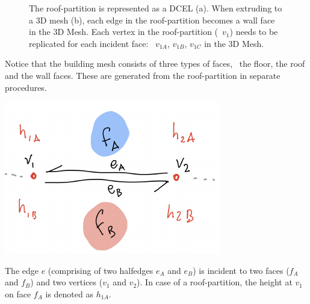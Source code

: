\begin{figure}
\begin{subfigure}[b]{0.45\linewidth}
		\caption{}%
		\label{subfig:3ddcel}
	\end{subfigure}
	\caption{The roof-partition is represented as a DCEL (a). When extruding to a 3D mesh (b), each edge in the roof-partition becomes a wall face in the 3D Mesh. Each vertex in the roof-partition (\eg\ $v_1$) needs to be replicated for each incident face: \eg\ $v_{1A}$, $v_{1B}$, $v_{1C}$ in the 3D Mesh.}%
	\label{fig:extrusion}
\end{figure}
Notice that the building mesh consists of three types of faces, \ie\ the floor, the roof and the wall faces.
These are generated from the roof-partition in separate procedures.

\begin{marginfigure}
	\centering
	\includegraphics[width=\linewidth]{figs/extrusion-edge.pdf}
	\caption{The edge $e$ (comprising of two halfedges $e_A$ and $e_B$) is incident to two faces ($f_A$ and $f_B$) and two vertices ($v_1$ and $v_2$). In case of a roof-partition, the height at $v_1$ on face $f_A$ is denoted as $h_{1A}$.}%
	\label{fig:extrusion-notation}
\end{marginfigure}

